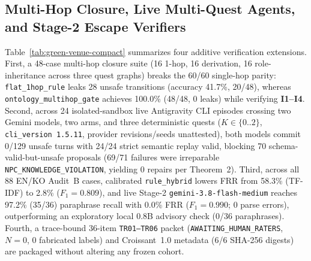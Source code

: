 \subsection{Multi-Hop Closure, Live Multi-Quest Agents, and Stage-2 Escape Verifiers}\label{sec:green-supplements}
Table~\ref{tab:green-venue-compact} summarizes four additive verification extensions. First, a 48-case multi-hop closure suite (16 1-hop, 16 derivation, 16 role-inheritance across three quest graphs) breaks the 60/60 single-hop parity: \texttt{flat\_}\allowbreak\texttt{1hop\_}\allowbreak\texttt{rule} leaks 28 unsafe transitions (accuracy 41.7\%, 20/48), whereas \texttt{ontology\_}\allowbreak\texttt{multihop\_}\allowbreak\texttt{gate} achieves 100.0\% (48/48, 0 leaks) while verifying \textbf{I1--I4}. Second, across 24 isolated-sandbox live Antigravity CLI episodes crossing two Gemini models, two arms, and three deterministic quests ($K{\in}\{0..2\}$, \texttt{cli\_version~1.5.11}, provider revisions/seeds unattested), both models commit 0/129 unsafe turns with 24/24 strict semantic replay valid, blocking 70 schema-valid-but-unsafe proposals (69/71 failures were irreparable \texttt{NPC\_}\allowbreak\texttt{KNOWLEDGE\_}\allowbreak\texttt{VIOLATION}, yielding $0$ repairs per Theorem~2). Third, across all 88 EN/KO Audit~B cases, calibrated \texttt{rule\_hybrid} lowers FRR from 58.3\% (TF-IDF) to 2.8\% ($F_1{=}0.809$), and live Stage-2 \texttt{gemini-3.8-}\allowbreak\texttt{flash-}\allowbreak\texttt{medium} reaches 97.2\% (35/36) paraphrase recall with 0.0\% FRR ($F_1{=}0.990$; 0 parse errors), outperforming an exploratory local 0.8B advisory check (0/36 paraphrases). Fourth, a trace-bound 36-item \texttt{TR01--TR06} packet (\texttt{AWAITING\_}\allowbreak\texttt{HUMAN\_}\allowbreak\texttt{RATERS}, $N{=}0$, 0 fabricated labels) and Croissant~1.0 metadata (6/6 SHA-256 digests) are packaged without altering any frozen cohort.

